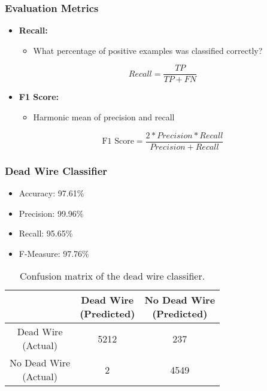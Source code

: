 \begin{frame}
  \frametitle{Evaluation Metrics}
  \begin{itemize}
    \item \textbf{Recall:}
      \begin{itemize}
        \item What percentage of positive examples was classified
          correctly?
      \end{itemize}
      \begin{equation}
        Recall = \frac{TP}{TP + FN}
      \end{equation}
    \item \textbf{F1 Score:}
      \begin{itemize}
        \item Harmonic mean of precision and recall
      \end{itemize}
      \begin{equation}
        \text{F1 Score} = \frac{2*Precision*Recall}{Precision+Recall}
      \end{equation}
  \end{itemize}
\end{frame}

\begin{frame}
  \frametitle{Dead Wire Classifier}
  \begin{itemize}
  \item Accuracy: 97.61\%
  \item Precision: 99.96\%
  \item Recall: 95.65\%
  \item F-Measure: 97.76\%
\end{itemize}
\begin{table}[h]
  \centering
  \renewcommand\theadfont{\bfseries}
  \begin{tabular}{|c|c|c|}
    \hline
    & \thead{Dead Wire\\(Predicted)} & \thead{No Dead Wire\\(Predicted)} \\
    \hline
    \thead{Dead Wire\\(Actual)} & 5212 & 237\\
    \hline
    \thead{No Dead Wire\\(Actual)} & 2 & 4549\\
    \hline
  \end{tabular}
  \caption{Confusion matrix of the dead wire classifier.}
\end{table}
\end{frame}


